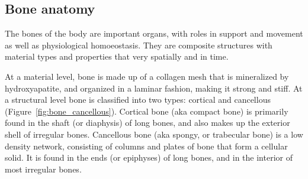 \subsection{Bone anatomy}
\label{sec:intro_boneAnat}
The bones of the body are important organs, with roles in support and movement as well as physiological homoeostasis.
They are composite structures with material types and properties that very spatially and in time.

At a material level, bone is made up of a collagen mesh that is mineralized by hydroxyapatite, and organized in a laminar fashion, making it strong and stiff.
At a structural level bone is classified into two types: cortical and cancellous (Figure~\ref{fig:bone_cancellous}).
Cortical bone (\acs{aka} compact bone) is primarily found in the shaft (or diaphysis) of long bones, and also makes up the exterior shell of irregular bones.
Cancellous bone (\acs{aka} spongy, or trabecular bone) is a low density network, consisting of columns and plates of bone that form a cellular solid.
It is found in the ends (or epiphyses) of long bones, and in the interior of most irregular bones.

